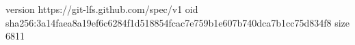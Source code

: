 version https://git-lfs.github.com/spec/v1
oid sha256:3a14faea8a19ef6c6284f1d518854fcac7e759b1e607b740dca7b1cc75d834f8
size 6811
